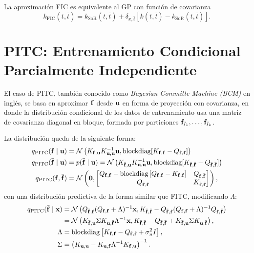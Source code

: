 \begin{proposition}
	La aproximación FIC es equivalente al GP con función de covarianza
	\begin{equation*}
		k_{\mathrm{FIC}}(t, \bar{t}) = k_{\mathrm{SoR}}(t, \bar{t}) + \delta_{x, \bar{t}} [k(t, \bar{t}) - k_{\mathrm{SoR}}(t, \bar{t})].
	\end{equation*}
\end{proposition}

\section{PITC: Entrenamiento Condicional Parcialmente Independiente}

El caso de PITC, también conocido como \emph{Bayesian Committe Machine (BCM)} en inglés, se basa en aproximar \(\mathbf{f}\) desde \(\mathbf{u}\) en forma de proyección con covarianza, en donde la distribución condicional de los datos de entrenamiento usa una matriz de covarianza diagonal en bloque, formada por particiones \(\mathbf{f}_{I_{1}}, \dotsc, \mathbf{f}_{I_{k}}\).

La distribución queda de la siguiente forma:
\begin{align*}
	q_{\mathrm{PITC}}(\mathbf{f} \mid \mathbf{u})		&= \mathcal{N}\left( K_{\mathbf{f}, \mathbf{u}} K_{\mathbf{u},\mathbf{u}}^{-1} \mathbf{u}, \operatorname{blockdiag}[K_{\mathbf{f}, \mathbf{f}} - Q_{\mathbf{f}, \mathbf{f}}]\right) \\
	q_{\mathrm{PITC}}(\bar{\mathbf{f}} \mid \mathbf{u})	&= p(\bar{\mathbf{f}} \mid \mathbf{u}) = \mathcal{N} \left(K_{\bar{\mathbf{f}},\mathbf{u}} K_{\mathbf{u}, \mathbf{u}}^{-1} \mathbf{u}, \operatorname{blockdiag}[K_{\bar{\mathbf{f}}, \bar{\mathbf{f}}} - Q_{\bar{\mathbf{f}}, \bar{\mathbf{f}}}]\right) \\
	q_{\mathrm{PITC}}(\mathbf{f}, \bar{\mathbf{f}})		&= \mathcal{N}\left(\mathbf{0}, \begin{bmatrix}
		Q_{\mathbf{f}, \mathbf{f}} - \operatorname{blockdiag}\left[ Q_{\mathbf{f}, \mathbf{f}} - K_{\mathbf{f}, \mathbf{f}}\right] & Q_{\mathbf{f}, \bar{\mathbf{f}}} \\
		Q_{\bar{\mathbf{f}}, \mathbf{f}} & K_{\bar{\mathbf{f}}, \bar{\mathbf{f}}}
	\end{bmatrix}
	\right),
\end{align*}
con una distribución predictiva de la forma similar que FITC, modificando \(\Lambda\):
\begin{align*}
	q_{\mathrm{PITC}}(\bar{\mathbf{f}} \mid \mathbf{x})	&= \mathcal{N}\left(Q_{\bar{\mathbf{f}}, \mathbf{f}}(Q_{\mathbf{f},\mathbf{f}} + \Lambda)^{-1}\mathbf{x}, K_{\bar{\mathbf{f}}, \bar{\mathbf{f}}} - Q_{\bar{\mathbf{f}}, \mathbf{f}}(Q_{\mathbf{f}, \mathbf{f}} + \Lambda)^{-1}Q_{\mathbf{f}, \bar{\mathbf{f}}}\right) \\
											&= \mathcal{N}\left(K_{\bar{\mathbf{f}}, \mathbf{u}} \Sigma K_{\mathbf{u}, \bar{\mathbf{f}}}\Lambda^{-1}\mathbf{x}, K_{\bar{\mathbf{f}}, \bar{\mathbf{f}}} - Q_{\bar{\mathbf{f}}, \bar{\mathbf{f}}} + K_{\bar{\mathbf{f}}, \mathbf{u}} \Sigma K_{\mathbf{u}, \bar{\mathbf{f}}}\right), \\
	\Lambda									&= \operatorname{blockdiag}\left[K_{\mathbf{f}, \mathbf{f}} - Q_{\mathbf{f}, \mathbf{f}} + \sigma_n^2 I\right], \\
	\Sigma									&= \left(K_{\mathbf{u}, \mathbf{u}} - K_{\mathbf{u}, \mathbf{f}} \Lambda^{-1} K_{\mathbf{f}, \mathbf{u}}\right)^{-1}.
\end{align*}

